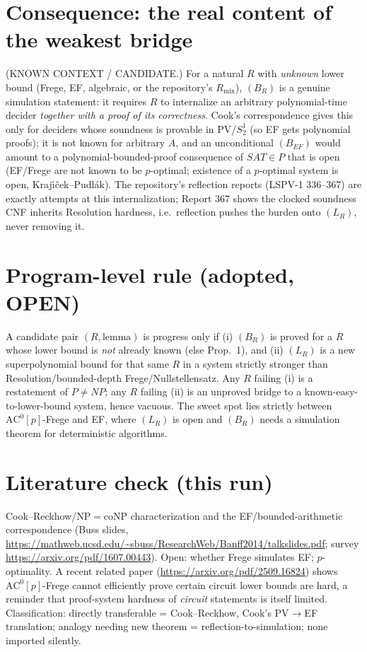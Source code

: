 \documentclass[11pt]{article}
\begin{document}
\section*{Consequence: the real content of the weakest bridge}
(KNOWN CONTEXT / CANDIDATE.) For a natural $R$ with \emph{unknown} lower bound (Frege, EF, algebraic, or the repository's $R_{\mathrm{mix}}$), $(B_R)$ is a genuine simulation statement: it requires $R$ to internalize an arbitrary polynomial-time decider \emph{together with a proof of its correctness}. Cook's correspondence gives this only for deciders whose soundness is provable in PV/$S^1_2$ (so EF gets polynomial proofs); it is not known for arbitrary $A$, and an unconditional $(B_{EF})$ would amount to a polynomial-bounded-proof consequence of $SAT\in P$ that is open (EF/Frege are not known to be $p$-optimal; existence of a $p$-optimal system is open, Kraj\'{\i}\v{c}ek--Pudl\'ak). The repository's reflection reports (LSPV-1 336--367) are exactly attempts at this internalization; Report 367 shows the clocked soundness CNF inherits Resolution hardness, i.e.\ reflection pushes the burden onto $(L_R)$, never removing it.

\section*{Program-level rule (adopted, OPEN)}
A candidate pair $(R,\text{lemma})$ is progress only if (i) $(B_R)$ is proved for a $R$ whose lower bound is \emph{not} already known (else Prop.~1), and (ii) $(L_R)$ is a new superpolynomial bound for that same $R$ in a system strictly stronger than Resolution/bounded-depth Frege/Nullstellensatz. Any $R$ failing (i) is a restatement of $P\neq NP$; any $R$ failing (ii) is an unproved bridge to a known-easy-to-lower-bound system, hence vacuous. The sweet spot lies strictly between $\mathrm{AC}^0[p]$-Frege and EF, where $(L_R)$ is open and $(B_R)$ needs a simulation theorem for deterministic algorithms.

\section*{Literature check (this run)}
Cook--Reckhow/NP$=$coNP characterization and the EF/bounded-arithmetic correspondence (Buss slides, \url{https://mathweb.ucsd.edu/~sbuss/ResearchWeb/Banff2014/talkslides.pdf}; survey \url{https://arxiv.org/pdf/1607.00443}). Open: whether Frege simulates EF; $p$-optimality. A recent related paper (\url{https://arxiv.org/pdf/2509.16824}) shows $\mathrm{AC}^0[p]$-Frege cannot efficiently prove certain circuit lower bounds are hard, a reminder that proof-system hardness of \emph{circuit} statements is itself limited. Classification: directly transferable = Cook--Reckhow, Cook's PV$\to$EF translation; analogy needing new theorem = reflection-to-simulation; none imported silently.
\end{document}
